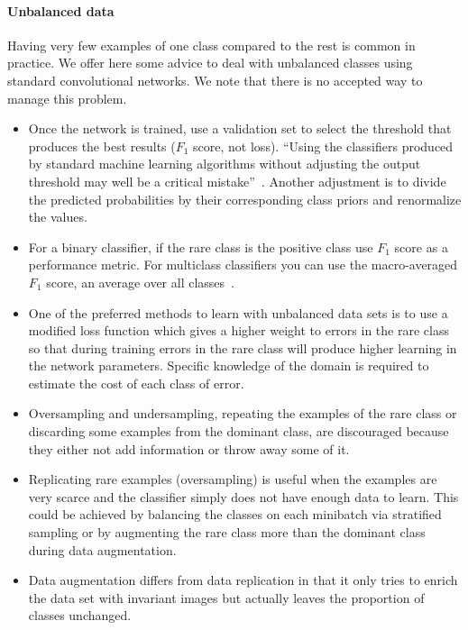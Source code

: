 \paragraph{Unbalanced data}
Having very few examples of one class compared to the rest is common in practice. We offer here some advice to deal with unbalanced classes using standard convolutional networks. We note that there is no accepted way to manage this problem.
\begin{itemize}
	\item Once the network is trained, use a validation set to select the threshold that produces the best results ($F_1$ score, not loss). ``Using the classifiers produced by standard machine learning algorithms without adjusting the output threshold may well be a critical mistake''~\cite{Provost2000}. Another adjustment is to divide the predicted probabilities by their corresponding class priors and renormalize the values. 

	\item For a binary classifier, if the rare class is the positive class use $F_1$ score as a performance metric. For multiclass classifiers you can use the macro-averaged $F_1$ score, an average over all classes~\cite{Ozgur2005}.

	\item One of the preferred methods to learn with unbalanced data sets is to use a modified loss function which gives a higher weight to errors in the rare class so that during training errors in the rare class will produce higher learning in the network parameters. Specific knowledge of the domain is required to estimate the cost of each class of error.

	\item Oversampling and undersampling, repeating the examples of the rare class or discarding some examples from the dominant class, are discouraged because they either not add information or throw away some of it.

	\item Replicating rare examples (oversampling) is useful when the examples are very scarce and the classifier simply does not have enough data to learn. This could be achieved by balancing the classes on each minibatch via stratified sampling or by augmenting the rare class more than the dominant class during data augmentation.

	\item Data augmentation differs from data replication in that it only tries to enrich the data set with invariant images but actually leaves the proportion of classes unchanged.
\end{itemize}

